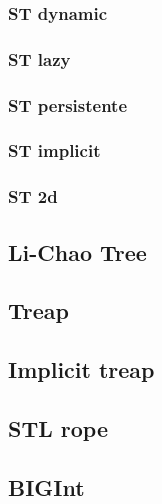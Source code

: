 \subsubsection{ST dynamic}

\subsubsection{ST lazy}

\subsubsection{ST persistente}

\subsubsection{ST implicit}

\subsubsection{ST 2d}


\subsection{Li-Chao Tree}


\subsection{Treap}

\subsection{Implicit treap}

\subsection{STL rope}



\subsection{BIGInt}

